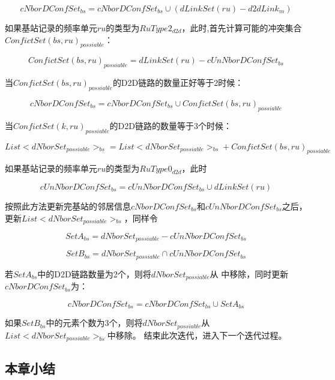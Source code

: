 \documentclass[figurelist,tablelist,algorithmlist,nomlist,masters]{seuthesix}
\begin{document}
\begin{enumerate}
		\begin{equation}\label{eq2.1}
		cNborDConfSe{t_{bs}} = cNborDConfSe{t_{bs}} \cup (dLinkSet(ru) - d2dLin{k_m})
		\end{equation}
		
		如果基站记录的频率单元$ru$的类型为$RuType{2_{d2d}}$，此时,首先计算可能的冲突集合$ConfictSet{(bs,ru)_{possiable}}$：
		
		\begin{equation}\label{eq2.1}
		ConfictSet{(bs,ru)_{possiable}} = dLinkSet(ru) - cUnNborDConfSe{t_{bs}}
		\end{equation}
		
		
		当$ConfictSet{(bs,ru)_{possiable}}$的D2D链路的数量正好等于2时候：
		
		\begin{equation}\label{eq2.1}
		cNborDConfSe{t_{bs}} = cNborDConfSe{t_{bs}} \cup ConfictSet{(bs,ru)_{possiable}}
		\end{equation}
		
		当$ConfictSet{(k,ru)_{possiable}}$的D2D链路的数量等于3个时候：
		
		\begin{equation}\label{eq2.1}
		List < dNborSe{t_{possiable}}{ > _{bs}} = List < dNborSe{t_{possiable}}{ > _{bs}} + ConfictSet{(bs,ru)_{possiable}}
		\end{equation}
		
		
		如果基站记录的频率单元$ru$的类型为$RuType{0_{d2d}}$，此时
		
		\begin{equation}\label{eq2.1}
		cUnNborDConfSe{t_{bs}} = cUnNborDConfSe{t_{bs}} \cup dLinkSet(ru)
		\end{equation}
		
		按照此方法更新完基站的邻居信息$cNborDConfSe{t_{bs}}$和$cUnNborDConfSe{t_{bs}}$之后，更新$List < dNborSe{t_{possiable}}{ > _{bs}}$，同样令
		
		\begin{equation}\label{eq2.1}
		Set{A_{bs}} = dNborSe{t_{possiable}} - cUnNborDConfSe{t_{bs}}
		\end{equation}
		
		\begin{equation}\label{eq2.1}
		Set{B_{bs}} = dNborSe{t_{possiable}} \cap cUnNborDConfSe{t_{bs}}
		\end{equation}
		
		若$Set{A_{bs}}$中的D2D链路数量为2个，则将$dNborSe{t_{possiable}}$从 中移除，同时更新$cNborDConfSe{t_{bs}}$为：
		
		\begin{equation}\label{eq2.1}
		cNborDConfSe{t_{bs}} = cNborDConfSe{t_{bs}} \cup Set{A_{bs}}
		\end{equation}
		
		如果$Set{B_{bs}}$中的元素个数为3个，则将$dNborSe{t_{possiable}}$从$List < dNborSe{t_{possiable}}{ > _{bs}}$中移除。 
		结束此次迭代，进入下一个迭代过程。
		
		\subsection{本章小结}
		
	\end{enumerate}
	
\end{document}
